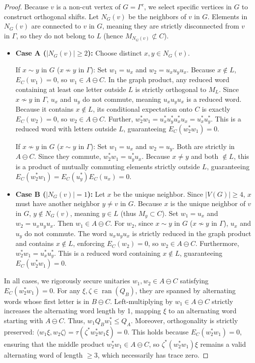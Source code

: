 \documentclass[12pt]{article}
\begin{document}
\begin{proof}
Because $v$ is a non-cut vertex of $G = \Gamma^c$, we select specific vertices in $G$ to construct orthogonal shifts. Let $N_{G}(v)$ be the neighbors of $v$ in $G$. Elements in $N_G(v)$ are connected to $v$ in $G$, meaning they are strictly disconnected from $v$ in $\Gamma$, so they do not belong to $L$ (hence $M_{N_G(v)} \not\subset C$). 
\begin{itemize}
    \item \textbf{Case A ($|N_G(v)| \ge 2$):} Choose distinct $x, y \in N_G(v)$. 
    
  If $x \sim y$ in $G$ ($x \nsim y$ in $\Gamma$): Set $w_1 = u_x$ and $w_2 = u_x u_y u_x$. Because $x \notin L$, $E_C(w_1) = 0$, so $w_1 \in A \ominus C$. In the graph product, any reduced word containing at least one letter outside $L$ is strictly orthogonal to $M_L$. Since $x \nsim y$ in $\Gamma$, $u_x$ and $u_y$ do not commute, meaning $u_x u_y u_x$ is a reduced word. Because it contains $x \notin L$, its conditional expectation onto $C$ is exactly $E_C(w_2) = 0$, so $w_2 \in A \ominus C$. Further, $w_2^* w_1 = u_x^* u_y^* u_x^* u_x = u_x^* u_y^*$. This is a reduced word with letters outside $L$, guaranteeing $E_C(w_2^* w_1) = 0$.
  
  If $x \nsim y$ in $G$ ($x \sim y$ in $\Gamma$): Set $w_1 = u_x$ and $w_2 = u_y$. Both are strictly in $A \ominus C$. Since they commute, $w_2^* w_1 = u_y^* u_x$. Because $x \neq y$ and both $\notin L$, this is a product of mutually commuting elements strictly outside $L$, guaranteeing $E_C(w_2^* w_1) = E_C(u_y^*)E_C(u_x) = 0$.
  
    \item \textbf{Case B ($|N_G(v)| = 1$):} Let $x$ be the unique neighbor. Since $|V(G)| \ge 4$, $x$ must have another neighbor $y \neq v$ in $G$. Because $x$ is the unique neighbor of $v$ in $G$, $y \notin N_G(v)$, meaning $y \in L$ (thus $M_y \subset C$). Set $w_1 = u_x$ and $w_2 = u_x u_y u_x$. Then $w_1 \in A \ominus C$. For $w_2$, since $x \sim y$ in $G$ ($x \nsim y$ in $\Gamma$), $u_x$ and $u_y$ do not commute. The word $u_x u_y u_x$ is strictly reduced in the graph product and contains $x \notin L$, enforcing $E_C(w_2) = 0$, so $w_2 \in A \ominus C$. Furthermore, $w_2^* w_1 = u_x^* u_y^*$. This is a reduced word containing $x \notin L$, guaranteeing $E_C(w_2^* w_1) = 0$.
\end{itemize}

In all cases, we rigorously secure unitaries $w_1, w_2 \in A \ominus C$ satisfying $E_C(w_2^* w_1) = 0$. 
For any $\xi, \zeta \in \operatorname{ran}(Q_B)$, they are spanned by alternating words whose first letter is in $B \ominus C$. Left-multiplying by $w_1 \in A \ominus C$ strictly increases the alternating word length by 1, mapping $\xi$ to an alternating word starting with $A \ominus C$. Thus, $w_1 Q_B w_1^* \le Q_A$. Moreover, orthogonality is strictly preserved: $\langle w_1 \xi, w_2 \zeta \rangle = \tau(\zeta^* w_2^* w_1 \xi) = 0$. This holds because $E_C(w_2^* w_1) = 0$, ensuring that the middle product $w_2^* w_1 \in A \ominus C$, so $\zeta^* (w_2^* w_1) \xi$ remains a valid alternating word of length $\ge 3$, which necessarily has trace zero.


\end{proof}
\end{document}

